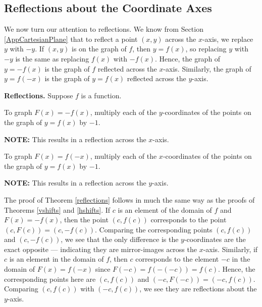 \subsection{Reflections about the Coordinate Axes}

We now turn our attention to reflections. We know from Section \ref{AppCartesianPlane} that to reflect a point $(x,y)$ across the $x$-axis, we replace $y$ with $-y$.  If $(x,y)$ is on the graph of $f$, then $y=f(x)$, so replacing $y$ with $-y$ is the same as replacing $f(x)$ with $-f(x)$.  Hence, the graph of $y=-f(x)$ is the graph of $f$ reflected across the $x$-axis.  Similarly, the graph of $y=f(-x)$ is the graph of $y = f(x)$ reflected across the $y$-axis.   

\begin{mthm} \label{reflections}\textbf{Reflections.}  Suppose $f$ is a function. 

  To graph $F(x)=-f(x)$,  multiply each of the $y$-coordinates of the points on the graph of $y=f(x)$ by $-1$.

\textbf{NOTE:}  This results in a reflection across the $x$-axis.

To graph $F(x)=f(-x)$,  multiply each of the $x$-coordinates of the points on the graph of $y=f(x)$ by $-1$.

\textbf{NOTE:}  This results in a reflection across the $y$-axis.

\end{mthm}

The proof of Theorem \ref{reflections} follows in much the same way as the proofs of Theorems \ref{vshifts} and \ref{hshifts}.  If $c$ is an element of the domain of $f$ and $F(x) = -f(x)$,  then the point $(c, f(c))$ corresponds to the point $(c, F(c)) = (c,-f(c))$.  Comparing the corresponding points $(c, f(c))$ and $(c, -f(c))$, we see that the only difference is the $y$-coordinates are the exact opposite --- indicating they are mirror-images across the $x$-axis.  Similarly, if $c$ is an element in the domain of $f$, then $c$ corresponds to the element $-c$ in the domain of $F(x) = f(-x)$ since $F(-c) = f(-(-c)) = f(c)$. Hence, the corresponding points here are $(c, f(c))$ and $(-c, F(-c)) = (-c, f(c))$.  Comparing $(c, f(c))$ with $(-c, f(c))$, we see they are reflections about the $y$-axis.


